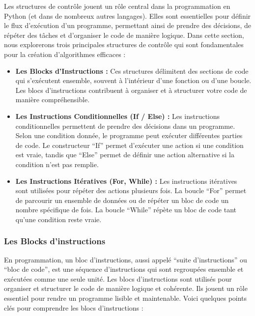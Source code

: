 \documentclass[11pt]{article}
\begin{document}
Les structures de contrôle jouent un rôle central dans la programmation
en Python (et dans de nombreux autres langages). Elles sont essentielles
pour définir le flux d'exécution d'un programme, permettant ainsi de
prendre des décisions, de répéter des tâches et d'organiser le code de
manière logique. Dans cette section, nous explorerons trois principales
structures de contrôle qui sont fondamentales pour la création
d'algorithmes efficaces :

\begin{itemize}
\item
  \textbf{Les Blocks d'Instructions :} Ces structures délimitent des
  sections de code qui s'exécutent ensemble, souvent à l'intérieur d'une
  fonction ou d'une boucle. Les blocs d'instructions contribuent à
  organiser et à structurer votre code de manière compréhensible.
\item
  \textbf{Les Instructions Conditionnelles (If / Else) :} Les
  instructions conditionnelles permettent de prendre des décisions dans
  un programme. Selon une condition donnée, le programme peut exécuter
  différentes parties de code. Le constructeur ``If'' permet d'exécuter
  une action si une condition est vraie, tandis que ``Else'' permet de
  définir une action alternative si la condition n'est pas remplie.
\item
  \textbf{Les Instructions Itératives (For, While) :} Les instructions
  itératives sont utilisées pour répéter des actions plusieurs fois. La
  boucle ``For'' permet de parcourir un ensemble de données ou de
  répéter un bloc de code un nombre spécifique de fois. La boucle
  ``While'' répète un bloc de code tant qu'une condition reste vraie.
\end{itemize}

    \hypertarget{les-blocks-dinstructions}{%
\subsubsection{Les Blocks
d'instructions}\label{les-blocks-dinstructions}}

En programmation, un bloc d'instructions, aussi appelé ``suite
d'instructions'' ou ``bloc de code'', est une séquence d'instructions
qui sont regroupées ensemble et exécutées comme une seule unité. Les
blocs d'instructions sont utilisés pour organiser et structurer le code
de manière logique et cohérente. Ils jouent un rôle essentiel pour
rendre un programme lisible et maintenable. Voici quelques points clés
pour comprendre les blocs d'instructions :
\end{document}

